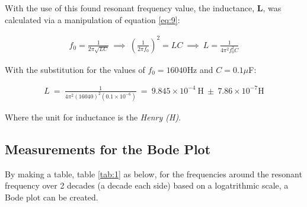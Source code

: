 \documentclass[12pt]{article}
\begin{document}
With the use of this found resonant frequency value, the inductance, \textbf{L}, was calculated via a manipulation of equation \ref{eq:9}:

\begin{gather} \label{eq:16}
    f_0 = \frac{1}{2 \pi \sqrt{LC}} \: \implies \: \left( \frac{1}{2 \pi f_0} \right)^2 = LC \: \implies \:
    L = \frac{1}{4 \pi^2 f_0^2 C}
\end{gather}

With the substitution for the values of $f_0 = 16040$Hz and $C = 0.1 \mu$F:

\begin{gather} \label{eq:17}
    L \: = \: \frac{1}{4 \pi^2 (16040)^2 (0.1 \times 10^{-6})} \: = \: 9.845 \times 10^{-4} \: \text{H} \: \pm \: 7.86 \times 10^{-7} \text{H}
\end{gather}

Where the unit for inductance is the \textit{Henry (H)}.

\subsection{Measurements for the Bode Plot} \label{sec:3.2}

By making a table, table \ref{tab:1} as below, for the frequencies around the resonant frequency over 2 decades (a decade each side) based on a logatrithmic scale,
a Bode plot can be created.

\renewcommand{\arraystretch}{1.3}
\end{document}
